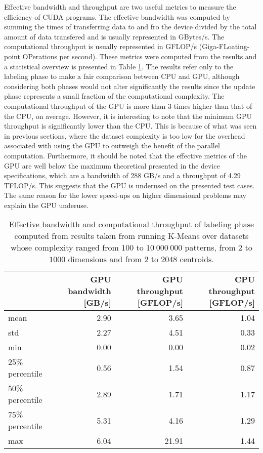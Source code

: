 Effective bandwidth and throughput are two useful metrics to measure the efficiency of CUDA programs.
The effective bandwidth was computed by summing the times of transferring data to and fro the device divided by the total amount of data transfered and is usually represented in GBytes/s.
The computational throughput is usually represented in GFLOP/s (Giga-FLoating-point OPerations per second).
These metrics were computed from the results and a statistical overview is presented in Table \ref{tab:kmeans performance metrics}.
The results refer only to the labeling phase to make a fair comparison between CPU and GPU, although considering both phases would not alter significantly the results since the update phase represents a small fraction of the computational complexity.
The computational throughput of the GPU is more than 3 times higher than that of the CPU, on average.
However, it is interesting to note that the minimum GPU throughput is significantly lower than the CPU.
This is because of what was seen in previous sections, where the dataset complexity is too low for the overhead associated with using the GPU to outweigh the benefit of the parallel computation.
Furthermore, it should be noted that the effective metrics of the GPU are well below the maximum theoretical presented in the device specifications, which are a bandwidth of 288 GB/s and a throughput of 4.29 TFLOP/s.
This suggests that the GPU is underused on the presented test cases.
The same reason for the lower speed-ups on higher dimensional problems may explain the GPU underuse.

\begin{table}[ht]
\centering
\caption{Effective bandwidth and computational throughput of labeling phase computed from results taken from running K-Means over datasets whose complexity ranged from $100$ to $10 \: 000 \: 000$ patterns, from $2$ to $1000$ dimensions and from $2$ to $2048$ centroids.}

\begin{tabular}{lrrr}
\toprule
{} &  GPU bandwidth [GB/s] &  GPU throughput [GFLOP/s] &  CPU throughput [GFLOP/s] \\
\midrule
mean             &         2.90 &    3.65 &        1.04 \\
std              &         2.27 &    4.51 &        0.33 \\
min              &         0.00 &    0.00 &        0.02 \\
25\% percentile &          0.56 &    1.54 &        0.87 \\
50\% percentile  &         2.89 &    1.71 &        1.17 \\
75\% percentile  &         5.31 &    4.16 &        1.29 \\
max             &          6.04 &   21.91 &        1.44 \\
\bottomrule
\end{tabular}

\label{tab:kmeans performance metrics}
\end{table}

